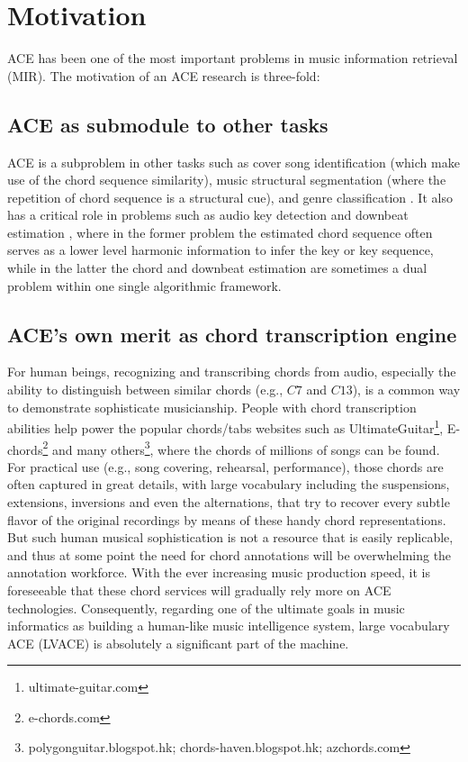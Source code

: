 \section{Motivation} \label{sec:1-moti}
ACE has been one of the most important problems in music information retrieval (MIR). The motivation of an ACE research is three-fold:

\subsection{ACE as submodule to other tasks}
ACE is a subproblem in other tasks such as cover song identification \cite{bello2007audio,lee2006identifying,serra2010audio} (which make use of the chord sequence similarity), music structural segmentation \cite{bello2005robust} (where the repetition of chord sequence is a structural cue), and genre classification \cite{cheng2008automatic,perez2009genre}. It also has a critical role in problems such as audio key detection \cite{papadopoulos2012modeling,pauwels2010integrating} and downbeat estimation \cite{papadopoulos2008simultaneous,mauch2010simultaneous}, where in the former problem the estimated chord sequence often serves as a lower level harmonic information to infer the key or key sequence, while in the latter the chord and downbeat estimation are sometimes a dual problem within one single algorithmic framework.

\subsection{ACE's own merit as chord transcription engine}
For human beings, recognizing and transcribing chords from audio, especially the ability to distinguish between similar chords (e.g., $C7$ and $C13$), is a common way to demonstrate sophisticate musicianship. People with chord transcription abilities help power the popular chords/tabs websites such as UltimateGuitar\footnote{ultimate-guitar.com}, E-chords\footnote{e-chords.com} and many others\footnote{polygonguitar.blogspot.hk; chords-haven.blogspot.hk; azchords.com}, where the chords of millions of songs can be found. For practical use (e.g., song covering, rehearsal, performance), those chords are often captured in great details, with large vocabulary including the suspensions, extensions, inversions and even the alternations, that try to recover every subtle flavor of the original recordings by means of these handy chord representations. But such human musical sophistication is not a resource that is easily replicable, and thus at some point the need for chord annotations will be overwhelming the annotation workforce. With the ever increasing music production speed, it is foreseeable that these chord services will gradually rely more on ACE technologies. Consequently, regarding one of the ultimate goals in music informatics as building a human-like music intelligence system, large vocabulary ACE (LVACE) is absolutely a significant part of the machine.

